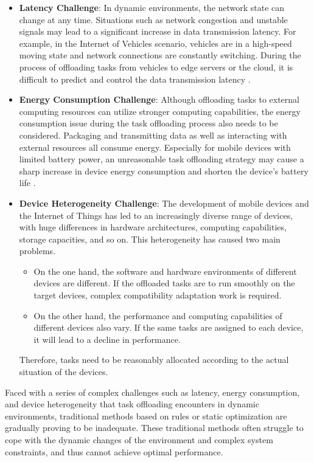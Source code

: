 \documentclass[journal]{IEEEtran}
\begin{document}
\begin{itemize}
    \item \textbf{Latency Challenge}: In dynamic environments, the network state can change at any time. Situations such as network congestion and unstable signals may lead to a significant increase in data transmission latency. For example, in the Internet of Vehicles scenario, vehicles are in a high-speed moving state and network connections are constantly switching. During the process of offloading tasks from vehicles to edge servers or the cloud, it is difficult to predict and control the data transmission latency \cite{8016573}.

    \item \textbf{Energy Consumption Challenge}: Although offloading tasks to external computing resources can utilize stronger computing capabilities, the energy consumption issue during the task offloading process also needs to be considered. Packaging and transmitting data as well as interacting with external resources all consume energy. Especially for mobile devices with limited battery power, an unreasonable task offloading strategy may cause a sharp increase in device energy consumption and shorten the device's battery life \cite{9319727}.

    \item \textbf{Device Heterogeneity Challenge}: The development of mobile devices and the Internet of Things has led to an increasingly diverse range of devices, with huge differences in hardware architectures, computing capabilities, storage capacities, and so on. This heterogeneity has caused two main problems. 
    \begin{itemize}
        \item On the one hand, the software and hardware environments of different devices are different. If the offloaded tasks are to run smoothly on the target devices, complex compatibility adaptation work is required.
        \item On the other hand, the performance and computing capabilities of different devices also vary. If the same tasks are assigned to each device, it will lead to a decline in performance.
    \end{itemize}
    Therefore, tasks need to be reasonably allocated according to the actual situation of the devices.
\end{itemize}

Faced with a series of complex challenges such as latency, energy consumption, and device heterogeneity that task offloading encounters in dynamic environments, 
traditional methods based on rules or static optimization are gradually proving to be inadequate. These traditional methods often struggle to cope with the dynamic changes of the environment and complex system constraints, and thus cannot achieve optimal performance.
\end{document}
